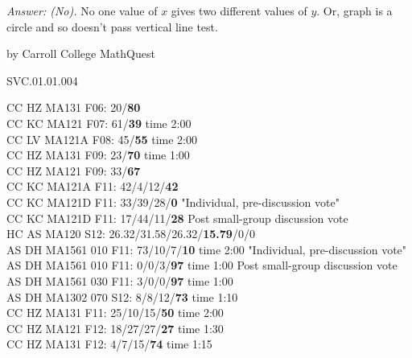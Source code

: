 {\it Answer: (No).} No one value of $x$ gives two different values of $y$. Or, graph is a circle and so doesn't pass vertical line test.


\medskip


by Carroll College MathQuest

SVC.01.01.004


CC HZ MA131 F06: 20/{\bf 80}
 \\
CC KC MA121 F07: 61/{\bf 39} time 2:00\\
CC LV MA121A F08: 45/{\bf 55} time 2:00 \\
CC HZ MA131 F09: 23/{\bf70} time 1:00  \\
CC HZ MA121 F09: 33/{\bf67}  \\
CC KC MA121A F11: 42/4/12/{\bf42}  \\
CC KC MA121D F11: 33/39/28/{\bf0} "Individual, pre-discussion vote" \\
CC KC MA121D F11: 17/44/11/{\bf28} Post small-group discussion vote \\
HC AS MA120 S12: 26.32/31.58/26.32/{\bf15.79}/0/0  \\
AS DH MA1561 010 F11: 73/10/7/{\bf10} time 2:00 "Individual, pre-discussion vote" \\
AS DH MA1561 010 F11: 0/0/3/{\bf97} time 1:00 Post small-group discussion vote \\
AS DH MA1561 030 F11: 3/0/0/{\bf97} time 1:00  \\
AS DH MA1302 070 S12: 8/8/12/{\bf73} time 1:10  \\
CC HZ MA131 F11: 25/10/15/{\bf50} time 2:00  \\
CC HZ MA121 F12: 18/27/27/{\bf27} time 1:30  \\
CC HZ MA131 F12: 4/7/15/{\bf74} time 1:15  \\
